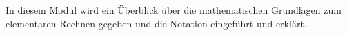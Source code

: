 

\Mtikzexternalize






\begin{MSectionStart}
\MModstartBox

In diesem Modul wird ein Überblick über die mathematischen Grundlagen zum elementaren Rechnen gegeben und die Notation eingeführt und erklärt.
\end{MSectionStart}


